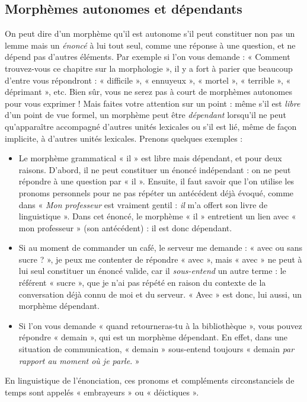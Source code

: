 \subsection{Morphèmes autonomes et dépendants}
On peut dire d’un morphème qu’il est autonome s’il peut constituer non pas un lemme mais un \textit{énoncé} à lui tout seul, comme une réponse à une question, et ne dépend pas d’autres éléments. Par exemple si l’on vous demande : « Comment trouvez-vous ce chapitre sur la morphologie », il y a fort à parier que beaucoup d’entre vous répondront : « difficile », « ennuyeux », « mortel », « terrible », « déprimant », etc. Bien sûr, vous ne serez pas à court de morphèmes autonomes pour vous exprimer ! Mais faites votre attention sur un point : même s’il est \textit{libre} d’un point de vue formel, un morphème peut être \textit{dépendant} lorsqu’il ne peut qu’apparaître accompagné d’autres unités lexicales ou s’il est lié, même de façon implicite, à d’autres unités lexicales. Prenons quelques exemples :
\begin{itemize}
\item Le morphème grammatical « il » est libre mais dépendant, et pour deux raisons. D’abord, il ne peut constituer un énoncé indépendant : on ne peut répondre à une question par « il ». Ensuite, il faut savoir que l’on utilise les pronoms personnels pour ne pas répéter un antécédent déjà évoqué, comme dans « \textit{Mon professeur} est vraiment gentil : \textit{il} m’a offert son livre de linguistique ». Dans cet énoncé, le morphème « il » entretient un lien avec « mon professeur » (son antécédent) : il est donc dépendant.
\item Si au moment de commander un café, le serveur me demande : « avec ou sans sucre ? », je peux me contenter de répondre « avec », mais « avec » ne peut à lui seul constituer un énoncé valide, car il \textit{sous-entend} un autre terme : le référent « sucre », que je n’ai pas répété en raison du contexte de la conversation déjà connu de moi et du serveur. « Avec » est donc, lui aussi, un morphème dépendant.
\item Si l’on vous demande « quand retourneras-tu à la bibliothèque », vous pouvez répondre « demain », qui est un morphème dépendant. En effet, dans une situation de communication, « demain » sous-entend toujours « demain \textit{par rapport au moment où je parle}. »
\end{itemize}
En linguistique de l’énonciation, ces pronoms et compléments circonstanciels de temps sont appelés « embrayeurs » ou « déictiques ».

